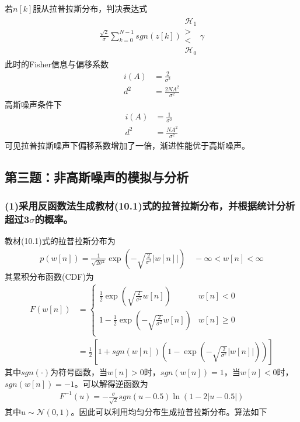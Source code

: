\documentclass[fontset=windows]{article}
\numberwithin{figure}{section}
\begin{document}
若\(n[k]\)服从拉普拉斯分布，判决表达式
\begin{align}
	\frac{\sqrt{2}}{\sigma}\sum_{k=0}^{N-1}sgn(z[k])
	\begin{matrix}
		\mathcal{H}_1 \\>\\<\\\mathcal{H_0}
	\end{matrix}\gamma
\end{align}
此时的Fisher信息与偏移系数
\begin{align}
	i(A) & =\frac{2}{\sigma^2}     \\
	d^2  & =\frac{2NA^2}{\sigma^2}
\end{align}
高斯噪声条件下
\begin{align}
	i(A) & =\frac{1}{\sigma^2}    \\
	d^2  & =\frac{NA^2}{\sigma^2}
\end{align}
可见拉普拉斯噪声下偏移系数增加了一倍，渐进性能优于高斯噪声。

\subsection{第三题：非高斯噪声的模拟与分析}

\subsubsection*{(1)采用反函数法生成教材(10.1)式的拉普拉斯分布，并根据统计分析超过3\(\sigma\)的概率。}

教材(10.1)式的拉普拉斯分布为
\begin{align*}
	p(w[n])=\frac{1}{\sqrt{2\sigma^2}}\exp\left(-\sqrt{\frac{2}{\sigma^2}}\vert w[n]\vert\right)\quad -\infty<w[n]<\infty
\end{align*}
其累积分布函数(CDF)为
\begin{align*}
	F(w[n]) & =\left\{
	\begin{matrix}
		\frac{1}{2}\exp(\sqrt{\frac{2}{\sigma^2}}w[n])    & w[n]<0         \\
		1-\frac{1}{2}\exp(-\sqrt{\frac{2}{\sigma^2}}w[n]) & w[n]\geqslant0 \\
	\end{matrix} \right. \\
	        & =\frac{1}{2}\left[1+sgn(w[n])(1-\exp\left(-\sqrt{\frac{2}{\sigma^2}}\vert w[n]\vert\right))\right]
\end{align*}
其中\(sgn(\cdot)\)为符号函数，当\(w[n]>0\)时，\(sgn(w[n])=1\)，当\(w[n]<0\)时，\(sgn(w[n])=-1\)。可以解得逆函数为
\begin{align*}
	F^{-1}(u)=-\frac{\sigma}{\sqrt{2}}sgn(u-0.5)\ln(1-2\vert u-0.5\vert)
\end{align*}
其中\(u\sim \mathcal{N}(0,1)\)。因此可以利用均匀分布生成拉普拉斯分布。算法如下
\end{document}
